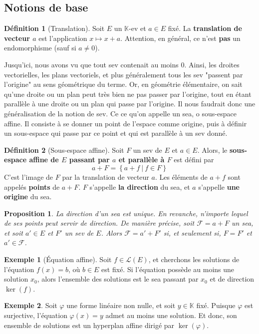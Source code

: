 \documentclass[french]{book}
\newcommand{\K}{\mathbb{K}}
\theoremstyle{plain}
\newtheorem{prop}{Proposition}[chapter]
\theoremstyle{definition}
\newtheorem{dfn}{Définition}[chapter]
\newtheorem{exa}{Exemple}[chapter]
\theoremstyle{remark}
\begin{document}
\subsection{Notions de base}
\begin{dfn}[Translation]
	Soit $E$ un $\K$-ev et $a\in E$ fixé. La \textbf{translation de vecteur $a$} est l'application $x\mapsto x+a$. Attention, en général, ce n'est \textbf{pas} un endomorphisme (sauf si $a\ne0$).
\end{dfn}
Jusqu'ici, nous avons vu que tout sev contenait au moins $0$. Ainsi, les droites vectorielles, les plans vectoriels, et plus généralement tous les sev "passent par l'origine" au sens géométrique du terme. Or, en géométrie élémentaire, on sait qu'une droite ou un plan peut très bien ne pas passer par l'origine, tout en étant parallèle à une droite ou un plan qui passe par l'origine. Il nous faudrait donc une généralisation de la notion de sev. Ce ce qu'on appelle un sea, o sous-espace affine. Il consiste à se donner un point de l'espace comme origine, puis à définir un sous-espace qui passe par ce point et qui est parallèle à un sev donné.
\begin{dfn}[Sous-espace affine]
	Soit $F$ un sev de $E$ et $a\in E$. Alors, le \textbf{sous-espace affine de $E$ passant par $a$ et parallèle à $F$} est défini par $$a+F=\left\{a+f\ | \ f\in F\right\}$$ C'est l'image de $F$ par la translation de vecteur $a$. Les éléments de $a+f$ sont appelés \textbf{points} de $a+F$. $F$ s'appelle \textbf{la direction} du sea, et $a$ s'appelle \textbf{une origine} du sea.
\end{dfn}
\begin{prop}
	La direction d'un sea est unique. En revanche, n'importe lequel de ses points peut servir de direction. De manière précise, soit $\mathcal{F}=a+F$ un sea, et soit $a'\in E$ et $F'$ un sev de $E$. Alors $\mathcal{F}=a'+F'$ si, et seulement si, $F=F'$ et $a'\in\mathcal{F}$.
\end{prop}
\begin{exa}[Équation affine]
	Soit $f\in\mathcal{L}(E)$, et cherchons les solutions de l'équation $f(x)=b$, où $b\in E$ est fixé. Si l'équation possède au moins une solution $x_0$, alors l'ensemble des solutions est le sea passant par $x_0$ et de direction $\ker(f)$.
\end{exa}
\begin{exa}
	Soit $\varphi$ une forme linéaire non nulle, et soit $y\in\K$ fixé. Puisque $\varphi$ est surjective, l'équation $\varphi(x)=y$ admet au moins une solution. Et donc, son ensemble de solutions est un hyperplan affine dirigé par $\ker(\varphi)$.
\end{exa}
\end{document}
